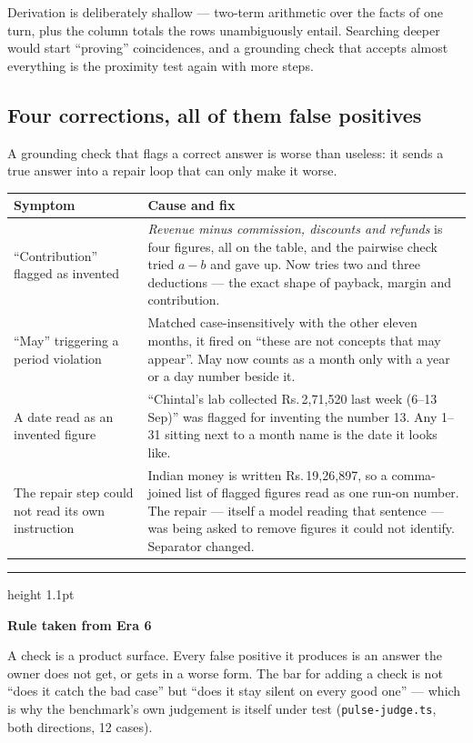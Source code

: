 \documentclass[11pt,a4paper]{report}
\newcommand{\rs}[1]{Rs.\,#1}
\newcommand{\file}[1]{\texttt{\small #1}}
\newenvironment{keybox}[1]
 {\par\medskip\begin{center}\begin{minipage}{0.94\textwidth}%
  {\color{navy}\hrule height 1.1pt}\vspace{5pt}\par
  \textbf{\color{navy}#1}\par\vspace{3pt}\small}
 {\par\vspace{5pt}{\color{mist}\hrule height 0.8pt}\end{minipage}\end{center}\medskip}
\begin{document}
Derivation is deliberately shallow --- two-term arithmetic over the facts of one turn, plus the
column totals the rows unambiguously entail. Searching deeper would start ``proving'' coincidences,
and a grounding check that accepts almost everything is the proximity test again with more steps.

\subsection{Four corrections, all of them false positives}

A grounding check that flags a correct answer is worse than useless: it sends a true answer into a
repair loop that can only make it worse.

\begin{center}
\small
\begin{tabular}{@{}p{4.6cm}p{10.2cm}@{}}
\toprule
\textbf{Symptom} & \textbf{Cause and fix}\\
\midrule
``Contribution'' flagged as invented & \emph{Revenue minus commission, discounts and refunds} is
 four figures, all on the table, and the pairwise check tried $a-b$ and gave up. Now tries two and
 three deductions --- the exact shape of payback, margin and contribution.\\
``May'' triggering a period violation & Matched case-insensitively with the other eleven months, it
 fired on ``these are not concepts that may appear''. May now counts as a month only with a year or
 a day number beside it.\\
A date read as an invented figure & ``Chintal's lab collected \rs{2{,}71{,}520} last week
 (6--13 Sep)'' was flagged for inventing the number 13. Any 1--31 sitting next to a month name is
 the date it looks like.\\
The repair step could not read its own instruction & Indian money is written \rs{19{,}26{,}897}, so
 a comma-joined list of flagged figures read as one run-on number. The repair --- itself a model
 reading that sentence --- was being asked to remove figures it could not identify. Separator
 changed.\\
\bottomrule
\end{tabular}
\end{center}

\begin{keybox}{Rule taken from Era 6}
A check is a product surface. Every false positive it produces is an answer the owner does not get,
or gets in a worse form. The bar for adding a check is not ``does it catch the bad case'' but
``does it stay silent on every good one'' --- which is why the benchmark's own judgement is itself
under test (\file{pulse-judge.ts}, both directions, 12 cases).
\end{keybox}
\end{document}
